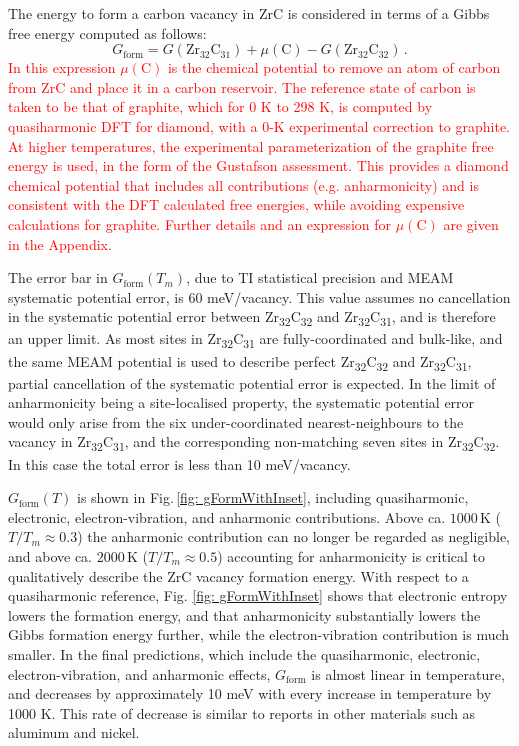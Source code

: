 \documentclass[twocolumn,american,aps,prb,showpacs,showkeys,amsmath,amssymb,superscriptaddress,a4]{revtex4-1}
\begin{document}
The energy to form a carbon vacancy in ZrC is considered in terms of a Gibbs free energy computed as follows:
\begin{equation}
G_{\text{form}}^{\text{}}=G\left(\text{Zr}_{32}\text{C}_{31}\right)+\mu(\text{C})-G\left(\text{Zr}_{32}\text{C}_{32}\right)\,.
\label{eq: gForm}
\end{equation}
 \textcolor{red}{In this expression $\mu(\text{C})$ is the chemical potential to remove an atom of carbon from ZrC and place it in a carbon reservoir. The reference state of carbon is taken to be that of graphite, which for 0 K to 298 K, is computed by quasiharmonic DFT for diamond, with a 0-K experimental correction to graphite. At higher temperatures, the experimental parameterization of the graphite free energy is used, in the form of the Gustafson\cite{Gustafson1986} assessment. This provides a diamond chemical potential that includes all contributions (e.g. anharmonicity) and is consistent with the DFT calculated free energies, while avoiding expensive calculations for graphite. Further details and an expression for $\mu(\text{C})$ are given in the Appendix.}

The error bar in $G_{\text{form}}^{\text{}}(T_m)$, due to TI statistical precision and MEAM systematic potential error, is 60 meV/vacancy. This value assumes no cancellation in the systematic potential error between Zr\textsubscript{32}C\textsubscript{32} and Zr\textsubscript{32}C\textsubscript{31}, and is therefore an upper limit. As most sites in Zr\textsubscript{32}C\textsubscript{31} are fully-coordinated and bulk-like, and the same MEAM potential is used to describe perfect Zr\textsubscript{32}C\textsubscript{32} and Zr\textsubscript{32}C\textsubscript{31}, partial cancellation of the systematic potential error is expected. In the limit of anharmonicity being a site-localised property, the systematic potential error would only arise from   the six under-coordinated nearest-neighbours to the vacancy in Zr\textsubscript{32}C\textsubscript{31}, and the corresponding non-matching seven sites in Zr\textsubscript{32}C\textsubscript{32}. In this case the total error is less than 10 meV/vacancy.

$G_{\text{form}}^{\text{}}(T)$ is shown in Fig.\,\ref{fig: gFormWithInset},
including quasiharmonic, electronic, electron-vibration, and anharmonic contributions. Above ca. $1000\,$K ($T/T_{m}\approx0.3$) the anharmonic contribution
can no longer be regarded as negligible, and above ca. $2000\,$K ($T/T_{m}\approx0.5$)
accounting for anharmonicity is critical to qualitatively describe
the ZrC vacancy formation energy. With respect to a quasiharmonic reference,
Fig. \ref{fig: gFormWithInset} shows that electronic entropy lowers
the formation energy, and that anharmonicity substantially lowers the Gibbs formation energy further, while the electron-vibration contribution is much smaller.
In the final predictions, which include the quasiharmonic, electronic, electron-vibration, and anharmonic effects, $G_{\text{form}}^{\text{}}$ is almost linear in temperature, and decreases by approximately 10 meV with every increase in temperature by 1000 K. This rate of decrease is similar to reports in other materials such as aluminum and nickel.\cite{Glensk2014,Gong2018}
\end{document}
